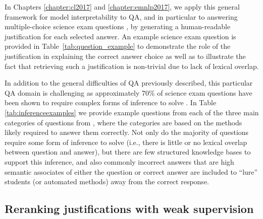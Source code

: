 In Chapters \ref{chapter:cl2017} and \ref{chapter:emnlp2017}, we apply this general framework for model interpretability to QA, and in particular to answering multiple-choice science exam questions \citep{clark:2015}, by generating a human-readable justification for each selected answer.  An example science exam question is provided in Table~\ref{tab:question_example} to demonstrate the role of the justification in explaining the correct answer choice as well as to illustrate the fact that retrieving such a justification is non-trivial due to lack of lexical overlap. 

In addition to the general difficulties of QA previously described, this particular QA domain is challenging as approximately 70\% of science exam questions have been shown to require complex forms of inference to solve \citep{clark:2013,jansen-EtAl:2016:COLING}.  In Table \ref{tab:inferenceexamples} we provide example questions from each of the three main categories of questions from \citet{clark:2013}, where the categories are based on the methods likely required to answer them correctly.  Not only do the majority of questions require some form of inference to solve (i.e., there is little or no lexical overlap between question and answer), but there are few structured knowledge bases to support this inference, and also commonly incorrect answers that are high semantic associates of either the question or correct answer are included to ``lure'' students (or automated methods) away from the correct response.

\subsection{Reranking justifications with weak supervision}
\label{sec:reranking_justifications}

